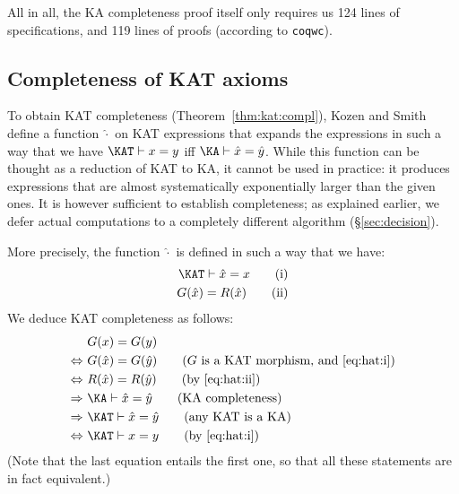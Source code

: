 \documentclass[a4paper]{llncs}
\begin{document}
\medskip

All in all, the KA completeness proof itself only requires us 124 lines
of specifications, and 119 lines of proofs (according to \texttt{coqwc}).

\subsection{Completeness of KAT axioms}
\label{ssec:kat:completeness}

To obtain KAT completeness (Theorem~\ref{thm:kat:compl}), Kozen and
Smith~\cite{kozens96:kat:completeness:decidability} define a function
$\hat\cdot$ on KAT expressions that expands the expressions in such a
way that we have $\KAT\vdash x=y$ iff $\KA\vdash\hat x = \hat y$.
While this function can be thought as a reduction of KAT to KA, it
cannot be used in practice: it produces expressions that are almost
systematically exponentially larger than the given ones. It is however
sufficient to establish completeness; as explained earlier, we defer
actual computations to a completely different algorithm
(§\ref{sec:decision}).

More precisely, the function $\hat\cdot$ is defined in such a way
that we have:
\begin{align}
  \label{eq:hat:i}\KAT\vdash \hat x = x \tag{i} \\
  \label{eq:hat:ii} G(\hat x) = R(\hat x) \tag{ii}
\end{align}
We deduce KAT completeness as follows:
\begin{align*}
  & G(x) = G(y)\\
  \Leftrightarrow~ & G(\hat x) = G(\hat y) \tag{$G$ is a KAT morphism, and~\eqref{eq:hat:i}}\\
  \Leftrightarrow~ & R(\hat x) = R(\hat y) \tag{by~\eqref{eq:hat:ii}}\\
  \Rightarrow~ & \KA\vdash \hat x = \hat y \tag{KA completeness}\\
  \Rightarrow~ & \KAT\vdash \hat x = \hat y \tag{any KAT is a KA}\\
  \Leftrightarrow~ & \KAT\vdash x = y \tag{by~\eqref{eq:hat:i}}
\end{align*}
(Note that the last equation entails the first one, so that all these
statements are in fact equivalent.)

\medskip
\end{document}
